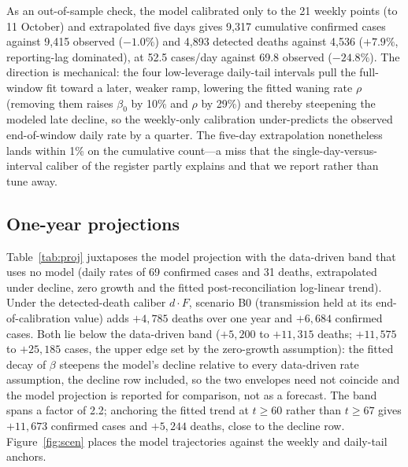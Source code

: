 \documentclass[preprint,12pt,numbers]{elsarticle}
\begin{document}
As an out-of-sample check, the model calibrated only to the 21 weekly
points (to 11 October) and extrapolated five days gives 9{,}317
cumulative confirmed cases against 9,415 observed ($-1.0\%$) and 4{,}893
detected deaths against 4,536 ($+7.9\%$, reporting-lag dominated), at
52.5 cases/day against 69.8 observed ($-24.8\%$). The direction is
mechanical: the four low-leverage daily-tail intervals pull the
full-window fit toward a later, weaker ramp, lowering the fitted waning
rate $\rho$ (removing them raises $\beta_0$ by 10\% and $\rho$ by 29\%)
and thereby steepening the modeled late decline, so the weekly-only
calibration under-predicts the observed end-of-window daily rate by a
quarter. The five-day extrapolation nonetheless lands within 1\% on the
cumulative count---a miss that the single-day-versus-interval caliber of
the register partly explains and that we report rather than tune away.
\subsection{One-year projections}\label{sec:scenarios}

Table~\ref{tab:proj} juxtaposes the model projection with the
data-driven band that uses no model (daily rates of 69 confirmed cases
and 31 deaths, extrapolated under decline, zero growth and the fitted
post-reconciliation log-linear trend). Under the detected-death caliber
$d\cdot F$, scenario B0 (transmission held at its end-of-calibration
value) adds $+4{,}785$ deaths over one year and $+6{,}684$ confirmed
cases. Both lie below the data-driven band ($+5{,}200$ to $+11{,}315$
deaths; $+11{,}575$ to $+25{,}185$ cases, the upper edge set by the
zero-growth assumption): the fitted decay of $\beta$
steepens the model's decline relative to every data-driven rate
assumption, the decline row included, so the two envelopes need not
coincide and the model projection is reported for comparison, not as a
forecast. The band spans a factor of 2.2; anchoring the fitted trend at
$t\ge60$ rather than $t\ge67$ gives $+11{,}673$ confirmed cases and
$+5{,}244$ deaths, close to the decline row. Figure~\ref{fig:scen} places the
model trajectories against the weekly and daily-tail anchors.
\end{document}
